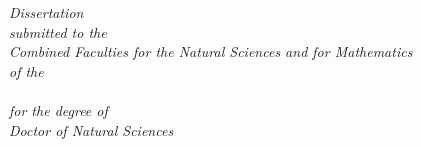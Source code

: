 \documentclass[
11pt, %
german, english,%
singlespacing, %
headsepline, %
]{MastersDoctoralThesis} %
\author{Santiago \textsc{Casas Castro}} %
\begin{document}
\frontmatter %

\pagestyle{plain} %




\begin{titlepage}
	\begin{center}
		
%		
		
		
		
		\large 
		\textit{Dissertation\\
			submitted to the\\
			Combined Faculties for the Natural Sciences and for Mathematics\\
			of the} \\ 
		\univname  \\
		\textit{for the degree of\\
			Doctor of Natural Sciences}
		 \\[14cm]
		

\end{center}
\end{titlepage}
\end{document}
